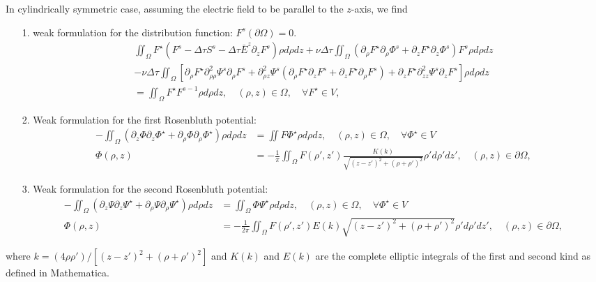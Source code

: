 \documentclass[reprint]{revtex4}
\begin{document}
In cylindrically symmetric case, assuming the electric field to be parallel to the $z$-axis, we find
\begin{itemize}
\item[1.] weak formulation for the distribution function: $F^s(\partial\Omega)=0$.
\begin{multline}
\iint_{\Omega}F^{\star}\left(F^s -\Delta\tau S^s-\Delta\tau\bar{E}^z\partial_z F^s\right)\rho d\rho dz
+\nu\Delta\tau\iint_{\Omega}\left(\partial_{\rho}F^{\star}\partial_{\rho}\Phi^s+\partial_{z}F^{\star}\partial_{z}\Phi^s\right) F^s\rho d\rho dz\\
-\nu\Delta\tau\iint_{\Omega}\left[\partial_{\rho}F^{\star}\partial^2_{\rho\rho}\Psi^s\partial_{\rho} F^s+\partial^2_{\rho z}\Psi^s\left(\partial_{\rho}F^{\star}\partial_{z} F^s+\partial_{z}F^{\star}\partial_{\rho} F^s\right)+\partial_{z}F^{\star}\partial^2_{zz}\Psi^s\partial_{z} F^s\right] \rho d\rho dz\\
=\iint_{\Omega}F^{\star}F^{s-1}\rho d\rho dz, \quad (\rho,z)\in\Omega, \quad \forall F^{\star}\in V,
\end{multline}
\item[2.] Weak formulation for the first Rosenbluth potential:
\begin{align}
-\iint_{\Omega} \left(\partial_z\Phi\partial_z\Phi^{\star}+\partial_{\rho}\Phi\partial_{\rho}\Phi^{\star}\right)\rho d\rho dz&=\iint F\Phi^{\star} \rho d\rho dz, \quad (\rho,z)\in\Omega, \quad \forall \Phi^{\star}\in V\\
 \Phi(\rho,z)&=-\frac{1}{\pi}\iint_{\Omega} F(\rho',z')\frac{K(k)}{\sqrt{(z-z')^2+(\rho+\rho')^2}}\rho'd\rho'dz', \quad (\rho,z)\in\partial\Omega,
\end{align}
\item[3.] Weak formulation for the second Rosenbluth potential:
\begin{align}
-\iint_{\Omega} \left(\partial_z\Psi\partial_z\Psi^{\star}+\partial_{\rho}\Psi\partial_{\rho}\Psi^{\star}\right)\rho d\rho dz&=\iint_{\Omega} \Phi\Psi^{\star} \rho d\rho dz, \quad (\rho,z)\in\Omega, \quad \forall \Phi^{\star}\in V\\
 \Phi(\rho,z)&=-\frac{1}{2\pi}\iint_{\Omega} F(\rho',z')E(k)\sqrt{(z-z')^2+(\rho+\rho')^2}\rho'd\rho'dz', \quad (\rho,z)\in\partial\Omega,
\end{align}
\end{itemize}
where $k=(4\rho\rho')/[(z-z')^2+(\rho+\rho')^2]$ and $K(k)$ and $E(k)$ are the complete elliptic integrals of the first and second kind as defined in Mathematica.
\end{document}
